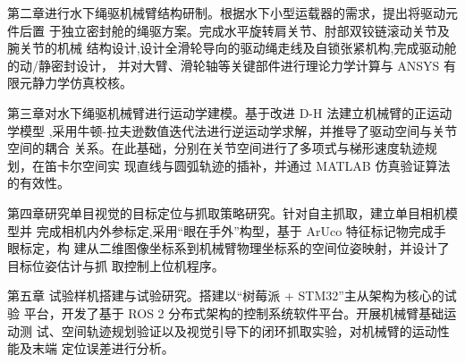 第二章进行水下绳驱机械臂结构研制。根据水下小型运载器的需求，提出将驱动元件后置
于独立密封舱的绳驱方案。完成水平旋转肩关节、肘部双铰链滚动关节及腕关节的机械
结构设计,设计全滑轮导向的驱动绳走线及自锁张紧机构,完成驱动舱的动/静密封设计，
并对大臂、滑轮轴等关键部件进行理论力学计算与 ANSYS 有限元静力学仿真校核。
    
第三章对水下绳驱机械臂进行运动学建模。基于改进 D-H 法建立机械臂的正运动学模型
,采用牛顿-拉夫逊数值迭代法进行逆运动学求解，并推导了驱动空间与关节空间的耦合
关系。在此基础，分别在关节空间进行了多项式与梯形速度轨迹规划，在笛卡尔空间实
现直线与圆弧轨迹的插补，并通过 MATLAB 仿真验证算法的有效性。

第四章研究单目视觉的目标定位与抓取策略研究。针对自主抓取，建立单目相机模型并
完成相机内外参标定,采用“眼在手外”构型，基于 ArUco 特征标记物完成手眼标定，构
建从二维图像坐标系到机械臂物理坐标系的空间位姿映射，并设计了目标位姿估计与抓
取控制上位机程序。
    
第五章 试验样机搭建与试验研究。搭建以“树莓派 + STM32”主从架构为核心的试验
平台，开发了基于 ROS 2 分布式架构的控制系统软件平台。开展机械臂基础运动测
试、空间轨迹规划验证以及视觉引导下的闭环抓取实验，对机械臂的运动性能及末端
定位误差进行分析。
    
\clearpage{
  \pagestyle{plain}
  \cleardoublepage
}
